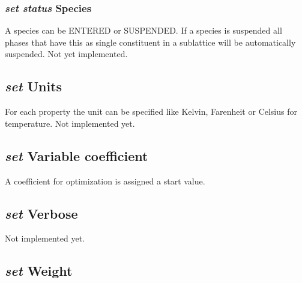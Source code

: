\documentclass[12pt]{article}
\begin{document}
\subsubsection{{\em set status} Species}

A species can be ENTERED or SUSPENDED.  If a species is suspended
all phases that have this as single constituent in a sublattice
will be automatically suspended.  Not yet implemented.

\subsection{{\em set} Units}

For each property the unit can be specified like Kelvin, Farenheit or
Celsius for temperature.  Not implemented yet.

\subsection{{\em set} Variable coefficient}

A coefficient for optimization is assigned a start value.

\subsection{{\em set} Verbose}

Not implemented yet.

\subsection{{\em set} Weight}
\end{document}
